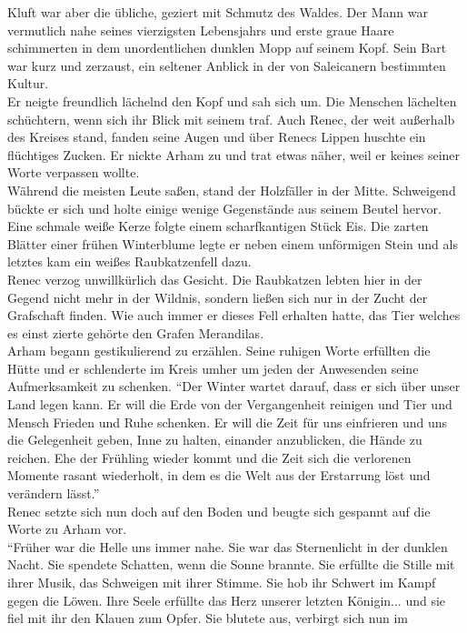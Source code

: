 Kluft war aber die übliche, geziert mit Schmutz des Waldes. Der Mann war vermutlich nahe seines 
vierzigsten Lebensjahrs und erste graue Haare schimmerten in dem unordentlichen dunklen Mopp auf 
seinem Kopf. Sein Bart war kurz und zerzaust, ein seltener Anblick in der von Saleicanern bestimmten 
Kultur.\\
Er neigte freundlich lächelnd den Kopf und sah sich um. Die Menschen lächelten schüchtern, wenn sich 
ihr Blick mit seinem traf. Auch Renec, der weit außerhalb des Kreises stand, fanden seine Augen und 
über Renecs Lippen huschte ein flüchtiges Zucken. Er nickte Arham zu und trat etwas näher, weil er 
keines seiner Worte verpassen wollte.\\
Während die meisten Leute saßen, stand der Holzfäller in der Mitte. Schweigend bückte er sich und 
holte einige wenige Gegenstände aus seinem Beutel hervor. Eine schmale weiße Kerze folgte einem 
scharfkantigen Stück Eis. Die zarten Blätter einer frühen Winterblume legte er neben einem 
unförmigen Stein und als letztes kam ein weißes Raubkatzenfell dazu.\\
Renec verzog unwillkürlich das Gesicht. Die Raubkatzen lebten hier in der Gegend nicht mehr in der 
Wildnis, sondern ließen sich nur in der Zucht der Grafschaft finden. Wie auch immer er dieses Fell 
erhalten hatte, das Tier welches es einst zierte gehörte den Grafen Merandilas.\\
Arham begann gestikulierend zu erzählen. Seine ruhigen Worte erfüllten die Hütte und er schlenderte 
im Kreis umher um jeden der Anwesenden seine Aufmerksamkeit zu schenken. ``Der Winter wartet darauf, 
dass er sich über unser Land legen kann. Er will die Erde von der Vergangenheit reinigen und Tier 
und Mensch Frieden und Ruhe schenken. Er will die Zeit für uns einfrieren und uns die Gelegenheit 
geben, Inne zu halten, einander anzublicken, die Hände zu reichen. Ehe der Frühling wieder kommt und 
die Zeit sich die verlorenen Momente rasant wiederholt, in dem es die Welt aus der Erstarrung löst 
und verändern lässt.''\\
Renec setzte sich nun doch auf den Boden und beugte sich gespannt auf die Worte zu Arham vor.\\
``Früher war die Helle uns immer nahe. Sie war das Sternenlicht in der dunklen Nacht. Sie spendete 
Schatten, wenn die Sonne brannte. Sie erfüllte die Stille mit ihrer Musik, das Schweigen mit ihrer 
Stimme. Sie hob ihr Schwert im Kampf gegen die Löwen. Ihre Seele erfüllte das Herz unserer letzten 
Königin... und sie fiel mit ihr den Klauen zum Opfer. Sie blutete aus, verbirgt sich nun im 
